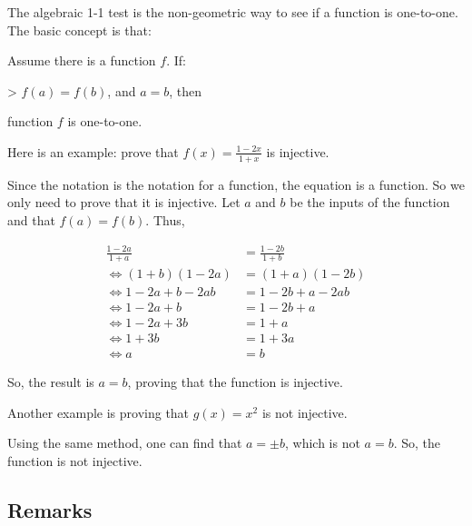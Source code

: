 The algebraic 1-1 test is the non-geometric way to see if a function is one-to-one. The
basic concept is that:



Assume there is a function $f$. If:



> $f(a)=f(b)$, and $a=b$, then



function $f$ is one-to-one.



Here is an example: prove that $f(x)=\frac{1-2x}{1+x}$ is injective.



Since the notation is the notation for a function, the equation is a function. So we only
need to prove that it is injective. Let $a$ and $b$ be the inputs of the function and that
$f(a)=f(b)$. Thus,



\begin{align} \frac{1-2a}{1+a} &= \frac{1-2b}{1+b} \\  \Leftrightarrow (1+b)(1-2a) &= (1+a)(1-2b) \\  \Leftrightarrow 1 - 2a + b - 2ab &= 1 - 2b + a - 2ab \\  \Leftrightarrow 1 - 2a + b &= 1 - 2b + a \\  \Leftrightarrow 1 - 2a + 3b &= 1 + a \\  \Leftrightarrow 1 + 3b &= 1 + 3a \\  \Leftrightarrow a &= b \end{align}



So, the result is $a=b$, proving that the function is injective.



Another example is proving that $g(x)=x^2$ is not injective.



Using the same method, one can find that $a=\pm b$, which is not $a=b$. So, the function
is not injective.




\subsection{Remarks}
\label{sss:rema-46b8}




